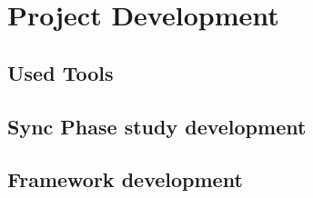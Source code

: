 \chapter{Project Development}

\section{Used Tools}

\section{Sync Phase study development}

\section{Framework development}
